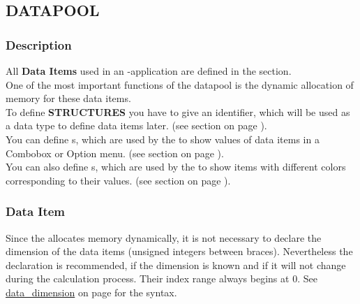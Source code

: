 \newpage
\subsection{DATAPOOL}
\label{sec:datapool}
\subsubsection{Description}
\label{sec:dpdescription}
All {\bfseries Data Items} used in an \INTENS{}-application are defined in the \DATAPOOL{} section.\\
One of the most important functions of the datapool is the dynamic allocation of memory for these data items.\\
\vspace{0.5cm}
To define {\bfseries STRUCTURES} you have to give an identifier, which will
be used as a data type to define data items later.
(see section  on page \pageref{sec:dpstruct}).\\
\vspace{0.5cm}
You can define \SET s, which are used by the \UIMANAGER{}
to show values of data items in a Combobox or Option menu.
(see section  on page \pageref{sec:dpset}).\\
\vspace{0.5cm}
You can also define \COLOR s, which are used by the \UIMANAGER{}
to show items with different colors corresponding to their values.
(see section  on page \pageref{sec:dpcolorset}).\\



\newpage
\subsubsection{Data Item}
\label{sec:dpitem}
Since the \DATAPOOL{} allocates memory dynamically, it is
not necessary to declare the dimension of the data items (unsigned integers
between braces).
Nevertheless the declaration is recommended, if
the dimension is known and if it will not change during the calculation
process. Their index range always begins at 0.
See \hyperref[dia:datadimension]{data\_dimension} on page \pageref{dia:datadimension} for the syntax. \\

